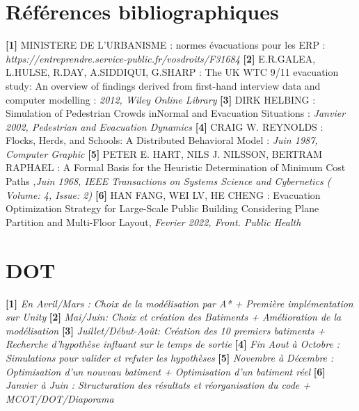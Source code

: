 \documentclass[12pt]{article}
\begin{document}
\section*{Références bibliographiques}
\textbf{[1]} MINISTERE DE L'URBANISME : normes évacuations pour les ERP : \textit{https://entreprendre.service-public.fr/vosdroits/F31684}
\newline\newline
\textbf{[2]} E.R.GALEA, L.HULSE, R.DAY, A.SIDDIQUI, G.SHARP : The UK WTC 9/11 evacuation study: An overview of findings
derived from first-hand interview data and computer modelling : \textit{2012,  Wiley Online Library} 
\newline\newline
\textbf{[3]} DIRK HELBING : Simulation of Pedestrian Crowds inNormal and Evacuation Situations : \textit{Janvier 2002, Pedestrian and Evacuation Dynamics}
\newline\newline
\textbf{[4]} CRAIG W. REYNOLDS : Flocks, Herds, and Schools:
A Distributed Behavioral Model : \textit{Juin 1987, Computer Graphic}
\newline\newline
\textbf{[5]} PETER E. HART, NILS J. NILSSON, BERTRAM RAPHAEL : A Formal Basis for the Heuristic Determination of Minimum Cost Paths
,\textit{Juin 1968, IEEE Transactions on Systems Science and Cybernetics ( Volume: 4, Issue: 2)}
\newline\newline
\textbf{[6]} HAN FANG, WEI LV, HE CHENG : Evacuation Optimization Strategy for Large-Scale Public Building Considering Plane Partition and Multi-Floor Layout,
\textit{Fevrier 2022, Front. Public Health}

\section*{DOT}
\textbf{[1]} \textit{En Avril/Mars : Choix de la modélisation par A* + Première implémentation sur Unity}
\newline\newline
\textbf{[2]} \textit{Mai/Juin: Choix et création des Batiments + Amélioration de la modélisation}
\newline\newline
\textbf{[3]} \textit{Juillet/Début-Août: Création des 10 premiers batiments + Recherche d'hypothèse influant sur le temps de sortie}
\newline\newline
\textbf{[4]} \textit{Fin Aout à Octobre : Simulations pour valider et refuter les hypothèses}
\newline\newline
\textbf{[5]} \textit{Novembre à Décembre : Optimisation d'un nouveau batiment + Optimisation d'un batiment réel}
\newline\newline
\textbf{[6]} \textit{Janvier à Juin : Structuration des résultats et réorganisation du code + MCOT/DOT/Diaporama}
\newline\newline
\end{document}

